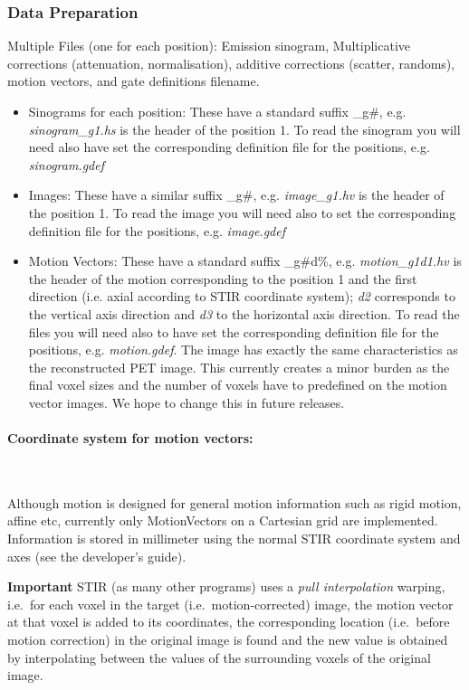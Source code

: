 \documentclass{article}
\newcommand{\subsubsubsection}[1]{\paragraph{#1}\mbox{} \\}
\begin{document}
{{{\subsubsection{Data Preparation}

Multiple
Files (one for each position): Emission sinogram, Multiplicative corrections
(attenuation, normalisation), additive corrections (scatter, randoms), motion
vectors, and gate definitions filename.

\begin{itemize}
\item Sinograms for each position: 
These have a standard suffix \_g\#, e.g. \textit{sinogram\_g1.hs} is the header of the
position 1. To read the sinogram you will need also have set the corresponding
definition file for the positions, e.g. \textit{sinogram.gdef}

\item Images:
These have a similar suffix \_g\#, e.g. \textit{image\_g1.hv} is the header of the
position 1. To read the image you will need also to set the corresponding
definition file for the positions, e.g. \textit{image.gdef}

\item Motion Vectors:
These have a standard suffix \_g\#d\%, e.g. \textit{motion\_g1d1.hv} is the header of the motion
corresponding to the position 1 and the first direction (i.e. axial according
to STIR coordinate system); \textit{d2} corresponds to the vertical axis
direction and \textit{d3} to the horizontal axis direction. To read the files you
will need also to have set the corresponding definition file for the positions,
e.g. \textit{motion.gdef}. The image has exactly the same characteristics as the
reconstructed PET image. This currently creates a minor burden as the final
voxel sizes and the number of voxels have to predefined on the motion vector
images. We hope to change this in future releases. 
\end{itemize}

{\subsubsubsection{Coordinate system for motion vectors: }}

Although motion is designed for general motion
information such as rigid motion, affine etc, currently only MotionVectors on a
Cartesian grid are implemented. Information is stored in millimeter using the normal
STIR coordinate system and axes (see the developer's guide).

\textbf{Important} STIR (as many other programs) uses a 
\textit{pull interpolation} warping, i.e.\ for each voxel in the target
(i.e.\ motion-corrected) image, the motion vector
at that voxel is added to its coordinates, the corresponding location (i.e.\ before motion correction)
in the original image is found and the new value is obtained by interpolating 
between the values of the surrounding voxels of the original image.

}}}
\end{document}
